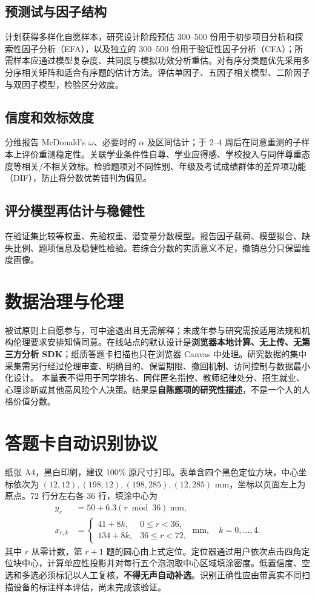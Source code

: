 \documentclass[11pt,a4paper,UTF8,fontset=none]{ctexart}
\begin{document}
\subsection{预测试与因子结构}
计划获得多样化自愿样本，研究设计阶段预估 300--500 份用于初步项目分析和探索性因子分析（EFA），以及独立的 300--500 份用于验证性因子分析（CFA）；所需样本应通过模型复杂度、共同度与模拟功效分析重估。对有序分类题优先采用多分序相关矩阵和适合有序题的估计方法。评估单因子、五因子相关模型、二阶因子与双因子模型，检验区分效度。
\subsection{信度和效标效度}
分维报告 McDonald's $\omega$、必要时的 $\alpha$ 及区间估计；于 2--4 周后在同意重测的子样本上评价重测稳定性。关联学业条件性自尊、学业应得感、学校投入与同伴尊重态度等相关/不相关效标。检验题项对不同性别、年级及考试成绩群体的差异项功能（DIF），防止将分数优势错判为偏见。
\subsection{评分模型再估计与稳健性}
在验证集比较等权重、先验权重、潜变量分数模型。报告因子载荷、模型拟合、缺失比例、题项信息及稳健性检验。若综合分数的实质意义不足，撤销总分只保留维度画像。
\section{数据治理与伦理}
被试原则上自愿参与，可中途退出且无需解释；未成年参与研究需按适用法规和机构伦理要求安排知情同意。在线站点的默认设计是\textbf{浏览器本地计算、无上传、无第三方分析 SDK}；纸质答题卡扫描也只在浏览器 Canvas 中处理。研究数据的集中采集需另行经过伦理审查、明确目的、保留期限、撤回机制、访问控制与数据最小化设计。
本量表不得用于同学排名、同伴匿名指控、教师纪律处分、招生就业、心理诊断或其他高风险个人决策。结果是\textbf{自陈题项的研究性描述}，不是一个人的人格价值分数。
\section{答题卡自动识别协议}
纸张 A4，黑白印刷，建议 100\% 原尺寸打印。表单含四个黑色定位方块，中心坐标依次为 $ (12,12),(198,12),(198,285),(12,285)$ mm，坐标以页面左上为原点。72 行分左右各 36 行，填涂中心为
\begin{align}
 y_r &= 50+6.3(r\bmod36)\ \text{mm},\\
 x_{r,k} &= \begin{cases}41+8k,&0\le r<36,\\134+8k,&36\le r<72,\end{cases}\ \text{mm},\quad k=0,\ldots,4.
\end{align}
其中 $r$ 从零计数，第 $r+1$ 题的圆心由上式定位。定位器通过用户依次点击四角定位块中心，计算单应性投影并对每行五个泡泡取中心区域填涂密度。低置信度、空选和多选必须标记以人工复核，\textbf{不得无声自动补选}。识别正确性应由带真实不同扫描设备的标注样本评估，尚未完成该验证。
\end{document}
